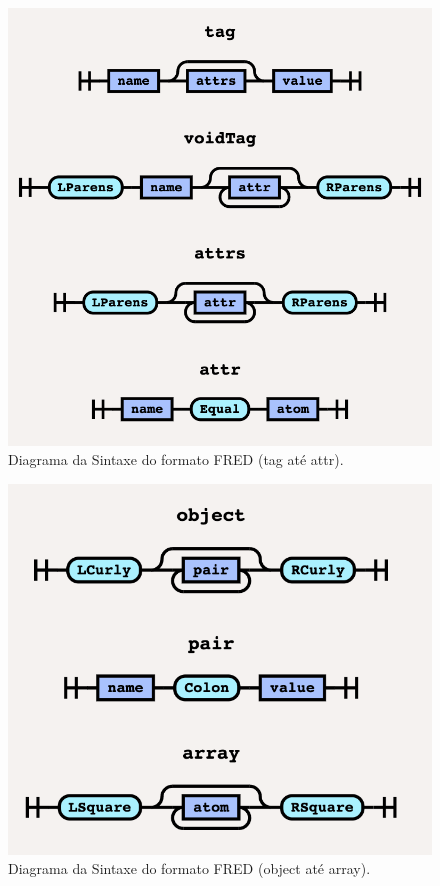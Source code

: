 \begin{apendicesenv}
\begin{figure}[]
	\centering
	\includegraphics[keepaspectratio=true,scale=1]{figuras/syntaxdiagram2.png}
	\caption{Diagrama da Sintaxe do formato FRED (tag até attr).}
\end{figure}

\begin{figure}[]
	\centering
	\includegraphics[keepaspectratio=true,scale=1]{figuras/syntaxdiagram3.png}
	\caption{Diagrama da Sintaxe do formato FRED (object até array).}
\end{figure}


\end{apendicesenv}
